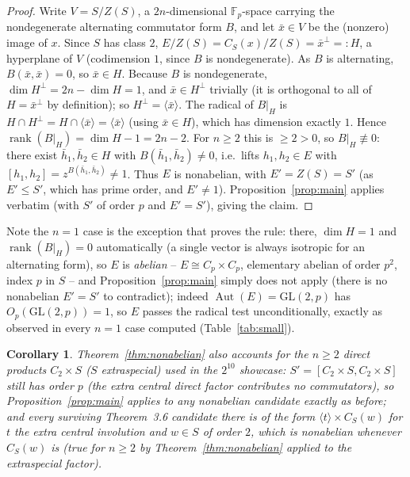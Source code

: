 \documentclass[11pt]{article}
\newtheorem{corollary}[theorem]{Corollary}
\theoremstyle{remark}
\begin{document}
\begin{proof}
Write $V = S/Z(S)$, a $2n$-dimensional $\mathbb{F}_p$-space carrying the
nondegenerate alternating commutator form $B$, and let $\bar{x} \in V$ be
the (nonzero) image of $x$. Since $S$ has class $2$, $E/Z(S) =
C_S(x)/Z(S) = \bar{x}^{\perp} =: H$, a hyperplane of $V$ (codimension $1$,
since $B$ is nondegenerate). As $B$ is alternating, $B(\bar{x},\bar{x})=0$,
so $\bar{x} \in H$. Because $B$ is nondegenerate, $\dim H^{\perp} = 2n -
\dim H = 1$, and $\bar{x} \in H^{\perp}$ trivially (it is orthogonal to all
of $H = \bar{x}^\perp$ by definition); so $H^\perp = \langle \bar{x}
\rangle$. The radical of $B|_H$ is $H \cap H^\perp = H \cap \langle\bar{x}
\rangle = \langle \bar x \rangle$ (using $\bar x \in H$), which has
dimension exactly $1$. Hence $\operatorname{rank}(B|_H) = \dim H - 1 =
2n-2$. For $n \ge 2$ this is $\ge 2 > 0$, so $B|_H \not\equiv 0$: there
exist $\bar h_1, \bar h_2 \in H$ with $B(\bar h_1,\bar h_2) \ne 0$, i.e.\
lifts $h_1,h_2 \in E$ with $[h_1,h_2] = z^{B(\bar h_1,\bar h_2)} \ne 1$.
Thus $E$ is nonabelian, with $E' = Z(S) = S'$ (as $E' \le S'$, which has
prime order, and $E'\ne 1$). Proposition~\ref{prop:main} applies verbatim
(with $S' $ of order $p$ and $E'=S'$), giving the claim.
\end{proof}

Note the $n=1$ case is the exception that proves the rule: there, $\dim H =
1$ and $\operatorname{rank}(B|_H) = 0$ automatically (a single vector is
always isotropic for an alternating form), so $E$ is \emph{abelian} --
$E \cong C_p \times C_p$, elementary abelian of order $p^2$, index $p$ in
$S$ -- and Proposition~\ref{prop:main} simply does not apply (there is no
nonabelian $E'=S'$ to contradict); indeed $\operatorname{Aut}(E) =
\mathrm{GL}(2,p)$ has $O_p(\mathrm{GL}(2,p))=1$, so $E$ passes the radical
test unconditionally, exactly as observed in every $n=1$ case computed
(Table~\ref{tab:small}).

\begin{corollary}
\label{cor:product}
Theorem~\ref{thm:nonabelian} also accounts for the $n \ge 2$ direct products
$C_2 \times S$ ($S$ extraspecial) used in the $2^{10}$ showcase: $S' =
[C_2\times S, C_2\times S]$ still has order $p$ (the extra central direct
factor contributes no commutators), so Proposition~\ref{prop:main} applies
to any nonabelian candidate exactly as before; and every surviving
Theorem~3.6 candidate there is of the form $\langle t \rangle \times C_S(w)$
for $t$ the extra central involution and $w \in S$ of order $2$, which is
nonabelian whenever $C_S(w)$ is (true for $n \ge 2$ by
Theorem~\ref{thm:nonabelian} applied to the extraspecial factor).
\end{corollary}
\end{document}
